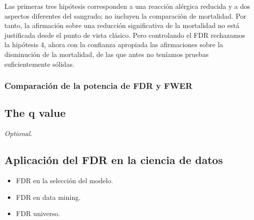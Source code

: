 \documentclass[11pt,letterpaper]{article}
\begin{document}
Las primeras tres hipótesis corresponden a una reacción alérgica reducida y a dos aspectos diferentes del sangrado; no incluyen la comparación de mortalidad. Por tanto, la afirmación sobre una reducción significativa de la mortalidad no está justificada desde el punto de vista clásico. Pero controlando el FDR rechazamos la hipótesis 4,  ahora con la confianza apropiada las afirmaciones sobre la disminución de la mortalidad, de las que antes no teníamos pruebas suficientemente sólidas.

\subsubsection*{Comparación de la potencia de FDR y FWER}


\subsection*{The q value }
\textit{Optional.}

\subsection*{Aplicación del FDR en la ciencia de datos}
\begin{itemize}
\item FDR en la selección del modelo.
\item FDR en data mining.
\item FDR universo.
\end{itemize}
\end{document}
